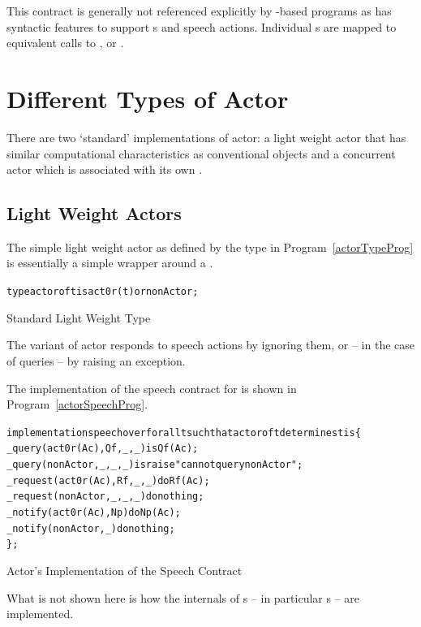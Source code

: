 This contract is generally not referenced explicitly by -based programs as \Sr has syntactic features to support s and speech actions. Individual s are mapped to equivalent calls to ,  or .


\section{Different Types of Actor}
\label{actorTypes}
There are two `standard' implementations of actor: a light weight actor that has similar computational characteristics as conventional objects and a concurrent actor which is associated with its own .

\subsection{Light Weight Actors}
\label{liteActor}

The simple light weight actor as defined by the  type in Program~\vref{actorTypeProg} is essentially a simple wrapper around a . 

\begin{program}
\begin{alltt}
type actor of t is act0r(t) or nonActor;
\end{alltt}
\caption{Standard Light Weight  Type}
\label{actorTypeProg}
\end{program}

The  variant of actor responds to speech actions by ignoring them, or -- in the case of queries -- by raising an exception.

The implementation of the speech contract for  is shown in Program~\vref{actorSpeechProg}.

\begin{program}
\begin{alltt}
implementation speech over for all t such that actor of t determines t is \{
  \_query(act0r(Ac),Qf,_,_) is Qf(Ac);
  \_query(nonActor,_,_,_) is raise "cannot query nonActor";
  \_request(act0r(Ac),Rf,_,_) do Rf(Ac);
  \_request(nonActor,_,_,_) do nothing;
  \_notify(act0r(Ac),Np) do Np(Ac);
  \_notify(nonActor,_) do nothing;
\};
\end{alltt}
\caption{Actor's Implementation of the Speech Contract}
\label{actorSpeechProg}
\end{program}
\begin{aside}
What is not shown here is how the internals of s -- in particular  s -- are implemented.
\end{aside}

